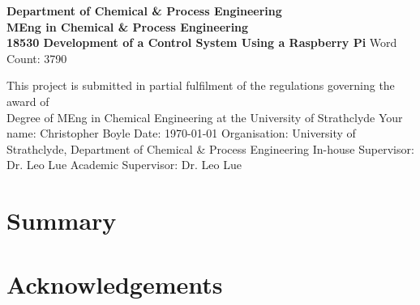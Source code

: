 \documentclass[a4]{report}
\def\atitle{Development of a Control System Using a Raspberry Pi}
\def\thewords{3790}
\def\achapter{preamble}
\begin{document}
	\begin{titlepage}
		\centering
		\vskip3cm
		{
			\bfseries\Large
			Department of Chemical \& Process Engineering\\
			\vskip1cm
			MEng in Chemical \& Process Engineering\\
			18530
			\vskip3cm
			\LARGE\atitle
		}
		\vskip3cm
		{\small Word Count: \thewords}
		\vskip1cm
		\begin{flushleft}
			This project is submitted in partial fulfilment of the regulations governing the award of \\
			Degree of MEng in Chemical Engineering at the University of Strathclyde
			\vskip2cm
			Your name: Christopher Boyle \hfill Date: \today
			\vskip1cm
			Organisation: University of Strathclyde, Department of Chemical \& Process Engineering\newline%
			In-house Supervisor: Dr. Leo Lue \newline%
			Academic Supervisor: Dr. Leo Lue
		\end{flushleft}
	\end{titlepage}

	
	\chapter*{Summary}
	\def\achapter{Summary}
	
	\def\achapter{Contents}
	\tableofcontents
	
	\chapter*{Acknowledgements}
	\def\achapter{Acknowledgements}
	
\end{document}

